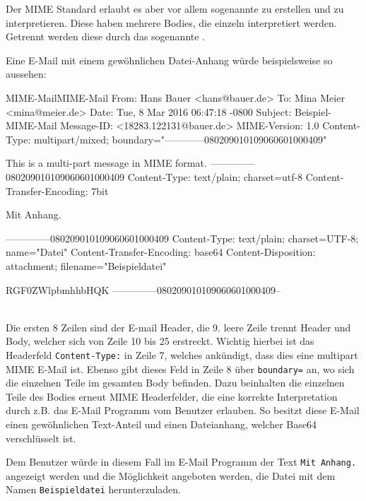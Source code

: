Der MIME Standard erlaubt es aber vor allem sogenannte  zu erstellen und zu interpretieren. Diese haben mehrere Bodies, die einzeln interpretiert werden. Getrennt werden diese durch das sogenannte .

Eine E-Mail mit einem gewöhnlichen Datei-Anhang würde beispielsweise so aussehen:

\begin{minipage}{\linewidth}
\begin{mail}{MIME-Mail}{MIME-Mail}
From: Hans Bauer <hans@bauer.de>
To: Mina Meier <mina@meier.de>
Date: Tue, 8 Mar 2016 06:47:18 -0800
Subject: Beispiel-MIME-Mail
Message-ID: <18283.122131@bauer.de>
MIME-Version: 1.0
Content-Type: multipart/mixed;
 boundary="------------080209010109060601000409"

This is a multi-part message in MIME format.
--------------080209010109060601000409
Content-Type: text/plain; charset=utf-8
Content-Transfer-Encoding: 7bit

Mit Anhang.

--------------080209010109060601000409
Content-Type: text/plain; charset=UTF-8;
 name="Datei"
Content-Transfer-Encoding: base64
Content-Disposition: attachment;
 filename="Beispieldatei"

RGF0ZWlpbmhhbHQK
--------------080209010109060601000409--
\end{mail}
\end{minipage}
\\

Die ersten 8 Zeilen sind der E-mail Header, die 9. leere Zeile trennt Header und Body, welcher sich von Zeile 10 bis 25 erstreckt. Wichtig hierbei ist das Headerfeld \verb#Content-Type:# in Zeile 7, welches ankündigt, dass dies eine multipart MIME E-Mail ist. Ebenso gibt dieses Feld in Zeile 8 über \verb#boundary=# an, wo sich die einzelnen Teile im gesamten Body befinden. Dazu beinhalten die einzelnen Teile des Bodies erneut MIME Headerfelder, die eine korrekte Interpretation durch z.B. das E-Mail Programm vom Benutzer erlauben. So besitzt diese E-Mail einen gewöhnlichen Text-Anteil und einen Dateianhang, welcher Base64 verschlüsselt ist.

Dem Benutzer würde in diesem Fall im E-Mail Programm der Text \verb#Mit Anhang.# angezeigt werden und die Möglichkeit angeboten werden, die Datei mit dem Namen \verb#Beispieldatei# herunterzuladen.
